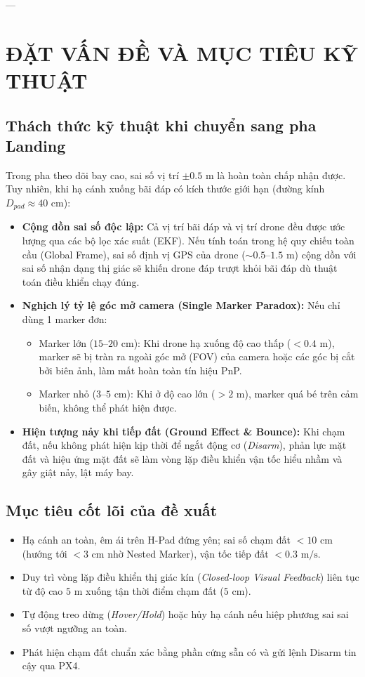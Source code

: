 \documentclass[12pt,a4paper]{article}
\begin{document}
---

\section{ĐẶT VẤN ĐỀ VÀ MỤC TIÊU KỸ THUẬT}

\subsection{Thách thức kỹ thuật khi chuyển sang pha Landing}
Trong pha theo dõi bay cao, sai số vị trí $\pm 0.5\text{ m}$ là hoàn toàn chấp nhận được. Tuy nhiên, khi hạ cánh xuống bãi đáp có kích thước giới hạn (đường kính $D_{pad} \approx 40\text{ cm}$):
\begin{itemize}[noitemsep,topsep=2pt]
    \item \textbf{Cộng dồn sai số độc lập:} Cả vị trí bãi đáp và vị trí drone đều được ước lượng qua các bộ lọc xác suất (EKF). Nếu tính toán trong hệ quy chiếu toàn cầu (Global Frame), sai số định vị GPS của drone ($\sim 0.5$--$1.5\text{ m}$) cộng dồn với sai số nhận dạng thị giác sẽ khiến drone đáp trượt khỏi bãi đáp dù thuật toán điều khiển chạy đúng.
    \item \textbf{Nghịch lý tỷ lệ góc mở camera (Single Marker Paradox):} Nếu chỉ dùng 1 marker đơn:
    \begin{itemize}[noitemsep]
        \item Marker lớn ($15$--$20\text{ cm}$): Khi drone hạ xuống độ cao thấp ($< 0.4\text{ m}$), marker sẽ bị tràn ra ngoài góc mở (FOV) của camera hoặc các góc bị cắt bởi biên ảnh, làm mất hoàn toàn tín hiệu PnP.
        \item Marker nhỏ ($3$--$5\text{ cm}$): Khi ở độ cao lớn ($> 2\text{ m}$), marker quá bé trên cảm biến, không thể phát hiện được.
    \end{itemize}
    \item \textbf{Hiện tượng nảy khi tiếp đất (Ground Effect \& Bounce):} Khi chạm đất, nếu không phát hiện kịp thời để ngắt động cơ (\textit{Disarm}), phản lực mặt đất và hiệu ứng mặt đất sẽ làm vòng lặp điều khiển vận tốc hiểu nhầm và gây giật nảy, lật máy bay.
\end{itemize}

\subsection{Mục tiêu cốt lõi của đề xuất}
\begin{itemize}[noitemsep,topsep=2pt]
    \item Hạ cánh an toàn, êm ái trên H-Pad đứng yên; sai số chạm đất $< 10\text{ cm}$ (hướng tới $< 3\text{ cm}$ nhờ Nested Marker), vận tốc tiếp đất $< 0.3\text{ m/s}$.
    \item Duy trì vòng lặp điều khiển thị giác kín (\textit{Closed-loop Visual Feedback}) liên tục từ độ cao $5\text{ m}$ xuống tận thời điểm chạm đất ($5\text{ cm}$).
    \item Tự động treo dừng (\textit{Hover/Hold}) hoặc hủy hạ cánh nếu hiệp phương sai sai số vượt ngưỡng an toàn.
    \item Phát hiện chạm đất chuẩn xác bằng phần cứng sẵn có và gửi lệnh Disarm tin cậy qua PX4.
\end{itemize}
\end{document}
